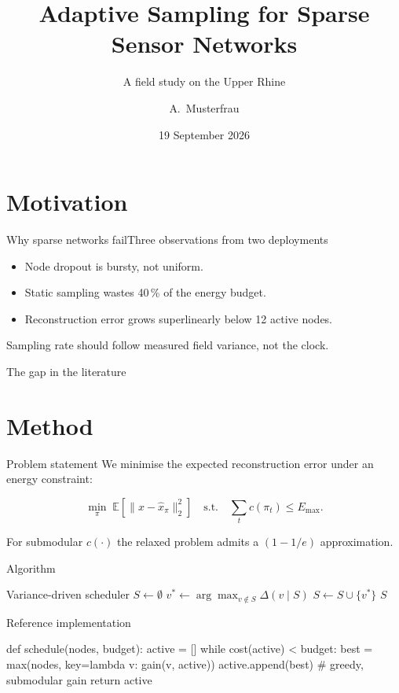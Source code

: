 \documentclass[aspectratio=169,10pt]{beamer}
\title{Adaptive Sampling for Sparse Sensor Networks}
\subtitle{A field study on the Upper Rhine}
\author{A.~Musterfrau}
\institute{Technische Hochschule Bingen}
\date{19 September 2026}
\begin{document}
\thbtitleframe
\thboutline
\section{Motivation}
\begin{frame}{Why sparse networks fail}{Three observations from two deployments}
  \begin{itemize}
    \item Node dropout is bursty, not uniform.
    \item Static sampling wastes 40\,\% of the energy budget.
    \item Reconstruction error grows superlinearly below 12 active nodes.
  \end{itemize}
  \begin{takeaway}
    Sampling rate should follow measured field variance, not the clock.
  \end{takeaway}
\end{frame}
\begin{frame}{The gap in the literature}
\end{frame}
\section{Method}
\begin{frame}{Problem statement}
  We minimise the expected reconstruction error under an energy constraint:
  \begin{keyeq}
    \begin{equation}
      \min_{\pi}\; \mathbb{E}\!\left[\lVert x - \hat{x}_{\pi}\rVert_2^2\right]
      \quad\text{s.t.}\quad \sum_{t} c(\pi_t) \le E_{\max}.
    \end{equation}
  \end{keyeq}
  \begin{theorem}
    For submodular $c(\cdot)$ the relaxed problem admits a $(1-1/e)$ approximation.
  \end{theorem}
\end{frame}
\begin{frame}{Algorithm}
  \begin{pseudocode}{Variance-driven scheduler}
    \State $S \gets \emptyset$
      \State $v^\ast \gets \arg\max_{v \notin S} \Delta(v \mid S)$
      \State $S \gets S \cup \{v^\ast\}$
    \EndWhile
    \State \Return $S$
  \end{pseudocode}
\end{frame}
\begin{frame}[fragile]{Reference implementation}
  \begin{code}[language=Python]
def schedule(nodes, budget):
    active = []
    while cost(active) < budget:
        best = max(nodes, key=lambda v: gain(v, active))
        active.append(best)   # greedy, submodular gain
    return active
  \end{code}
\end{frame}
\end{document}
